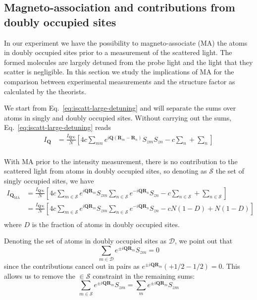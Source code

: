 \documentclass[11pt,letter]{article}
\newcommand{\bv}[1]{\ensuremath{\bm{#1}}}
\newcommand{\Iqtof}{\ensuremath{I_{\bv{Q}\infty} }}
\newcommand{\Iq}{\ensuremath{I_{\bv{Q}} }}
\newcommand{\Iqma}{\ensuremath{I_{\bv{Q}_{\text{MA}}} }}
\begin{document}
\subsection{Magneto-association and contributions from doubly occupied sites} 

In our experiment we have the possibility to  magneto-associate (MA) the atoms
in doubly occupied sites prior to a measurement of the scattered light.  The
formed molecules  are largely detuned from the probe light and the light that
they scatter is negligible. In this section we study the implications of MA for
the comparison between experimental measurements and the structure factor as
calculated by the theorists. 

We start from Eq.~\ref{eq:iscatt-large-detuning} and will separate the sums
over atoms in singly and doubly occupied sites.  Without carrying out the sums,
Eq.~\ref{eq:iscatt-large-detuning} reads 
\begin{equation}
\begin{split} 
 \Iq 
&  = \frac{ \Iqtof }{N} 
  \left[ 
      4 c \sum_{mn}  
      e^{ i \bv{Q}( \bv{R}_{m} - \bv{R}_{n} ) } 
      S_{zm}S_{zn}
    -  c  \sum_{n} 
  + \sum_{n}  
   \right]  \\ 
\end{split}
\end{equation}

With MA prior to the intensity measurement, there is no contribution to the
scattered light from atoms in doubly occupied sites, so denoting as
$\mathcal{S}$ the set of singly occupied sites, we have 
\begin{equation}
\begin{split} 
 \Iqma  
&  = \frac{ \Iqtof }{N} 
  \left[ 
      4 c \sum_{m\in \mathcal{S}}  
      e^{ i \bv{Q} \bv{R}_{m} } S_{zm} 
      \sum_{n\in \mathcal{S} } 
      e^{ -i \bv{Q} \bv{R}_{n} } S_{zn} 
    -  c  \sum_{n\in \mathcal{S}} 
  + \sum_{n \in \mathcal{S}}  
   \right]  \\ 
&  = \frac{ \Iqtof }{N} 
  \left[ 
      4 c \sum_{m\in \mathcal{S}}  
      e^{ i \bv{Q} \bv{R}_{m} } S_{zm} 
      \sum_{n\in \mathcal{S} } 
      e^{ -i \bv{Q} \bv{R}_{n} } S_{zn} 
    -  c N(1-D)  + N(1-D) 
   \right]  \\ 
\end{split}
\end{equation}
where $D$ is the fraction of atoms in doubly occupied sites.  

Denoting the set of atoms in doubly occupied sites as $\mathcal{D}$, we point
out that 
\begin{equation}
 \sum_{m \in \mathcal{D} }  e^{ \pm i \bv{Q} \bv{R}_{m}} S_{zm} = 0 
\end{equation}
since the contributions cancel out in pairs as $   e^{ \pm i \bv{Q} \bv{R}_{m}}
( +1/2 - 1/2 ) = 0 $.  This allows us to remove the $\in \mathcal{S}$
constraint in the remaining sums: 
\begin{equation}
 \sum_{m \in \mathcal{S} }  e^{ \pm i \bv{Q} \bv{R}_{m}} S_{zm} = 
 \sum_{m}  e^{ \pm i \bv{Q} \bv{R}_{m}} S_{zm}  
\end{equation}
\end{document}
